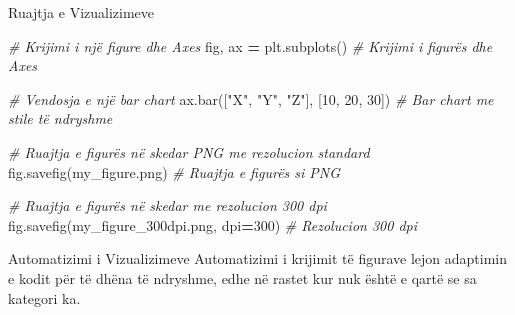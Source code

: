 \documentclass[
  ignorenonframetext,
]{beamer}
\newenvironment{Shaded}{\begin{snugshade}}{\end{snugshade}}
\newcommand{\CommentTok}[1]{\textcolor[rgb]{0.56,0.35,0.01}{\textit{#1}}}
\newcommand{\DecValTok}[1]{\textcolor[rgb]{0.00,0.00,0.81}{#1}}
\newcommand{\NormalTok}[1]{#1}
\newcommand{\OperatorTok}[1]{\textcolor[rgb]{0.81,0.36,0.00}{\textbf{#1}}}
\newcommand{\StringTok}[1]{\textcolor[rgb]{0.31,0.60,0.02}{#1}}
\begin{document}
\begin{frame}[fragile]{Ruajtja e Vizualizimeve}
\protect\hypertarget{ruajtja-e-vizualizimeve-1}{}

\begin{Shaded}
\begin{Highlighting}[]
\CommentTok{\# Krijimi i një figure dhe Axes}
\NormalTok{fig, ax }\OperatorTok{=}\NormalTok{ plt.subplots()  }\CommentTok{\# Krijimi i figurës dhe Axes}

\CommentTok{\# Vendosja e një bar chart}
\NormalTok{ax.bar([}\StringTok{"X"}\NormalTok{, }\StringTok{"Y"}\NormalTok{, }\StringTok{"Z"}\NormalTok{], [}\DecValTok{10}\NormalTok{, }\DecValTok{20}\NormalTok{, }\DecValTok{30}\NormalTok{])  }\CommentTok{\# Bar chart me stile të ndryshme}

\CommentTok{\# Ruajtja e figurës në skedar PNG me rezolucion standard}
\NormalTok{fig.savefig(}\StringTok{\textquotesingle{}my\_figure.png\textquotesingle{}}\NormalTok{)  }\CommentTok{\# Ruajtja e figurës si PNG}

\CommentTok{\# Ruajtja e figurës në skedar me rezolucion 300 dpi}
\NormalTok{fig.savefig(}\StringTok{\textquotesingle{}my\_figure\_300dpi.png\textquotesingle{}}\NormalTok{, dpi}\OperatorTok{=}\DecValTok{300}\NormalTok{)  }\CommentTok{\# Rezolucion 300 dpi}
\end{Highlighting}
\end{Shaded}
\end{frame}

\begin{frame}{Automatizimi i Vizualizimeve}
\protect\hypertarget{automatizimi-i-vizualizimeve}{}
Automatizimi i krijimit të figurave lejon adaptimin e kodit për të dhëna
të ndryshme, edhe në rastet kur nuk është e qartë se sa kategori ka.
\end{frame}
\end{document}
